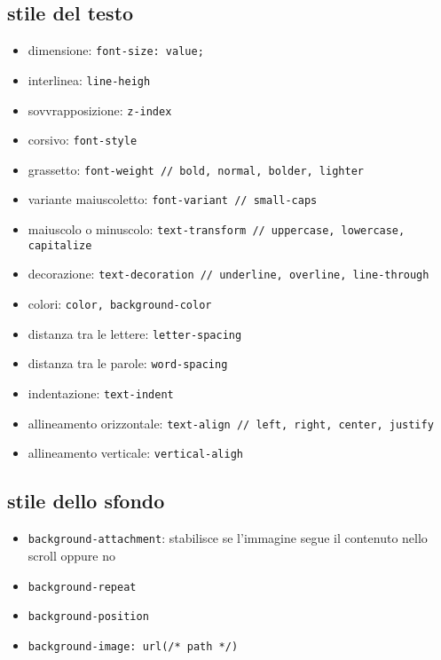 \documentclass[11pt]{article}
\begin{document}
\subsection{stile del testo}
\begin{itemize}
	\item dimensione: \lstinline{font-size: value;}
	\item interlinea: \lstinline{line-heigh}
	\item sovvrapposizione: \lstinline{z-index}
	\item corsivo: \lstinline{font-style}
	\item grassetto: \lstinline{font-weight // bold, normal, bolder, lighter}
	\item variante maiuscoletto: \lstinline{font-variant // small-caps}
	\item maiuscolo o minuscolo: \lstinline{text-transform // uppercase, lowercase, capitalize}
	\item decorazione: \lstinline{text-decoration // underline, overline, line-through}
	\item colori: \lstinline{color, background-color}
	
	\item distanza tra le lettere: \lstinline{letter-spacing}
	\item distanza tra le parole: \lstinline{word-spacing}
	\item indentazione: \lstinline{text-indent}
	\item allineamento orizzontale: \lstinline{text-align // left, right, center, justify}
	\item allineamento verticale: \lstinline{vertical-aligh}
\end{itemize}

\subsection{stile dello sfondo}
\begin{itemize}
	\item \lstinline{background-attachment}: stabilisce se l'immagine segue il
		contenuto nello scroll oppure no
	\item \lstinline{background-repeat}
	\item \lstinline{background-position}
	\item \lstinline{background-image: url(/* path */)}
\end{itemize}
\end{document}
